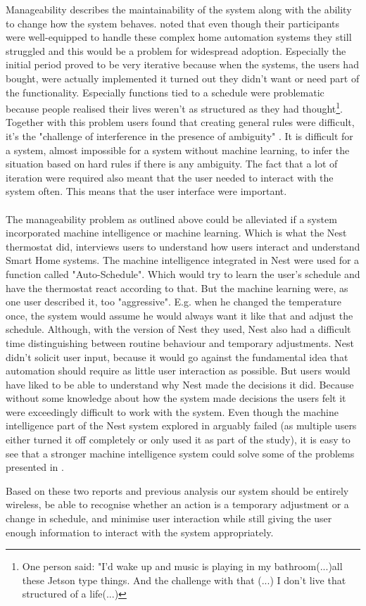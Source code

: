 Manageability describes the maintainability of the system along with the ability to change how the system behaves. \cite{HAInterviews} noted that even though their participants were well-equipped to handle these complex home automation systems they still struggled and this would be a problem for widespread adoption. Especially the initial period proved to be very iterative because when the systems, the users had bought, were actually implemented it turned out they didn't want or need part of the functionality. Especially functions tied to a schedule were problematic because people realised their lives weren't as structured as they had thought\footnote{One person said: "I'd wake up and music is playing in my bathroom(...)all these Jetson type things. And the challenge with that (...) I don't live that structured of a life(...)}. Together with this problem users found that creating general rules were difficult, it's the "challenge of interference in the presence of ambiguity" \cite{HAInterviews}. It is difficult for a system, almost impossible for a system without machine learning, to infer the situation based on hard rules if there is any ambiguity. The fact that a lot of iteration were required also meant that the user needed to interact with the system often. This means that the user interface were important.
\\\\
The manageability problem as outlined above could be alleviated if a system incorporated machine intelligence or machine learning. Which is what the Nest thermostat did, \cite{AdaptiveInterviews} interviews users to understand how users interact and understand Smart Home systems. The machine intelligence integrated in Nest were used for a function called "Auto-Schedule". Which would try to learn the user's schedule and have the thermostat react according to that. But the machine learning were, as one user described it\cite{AdaptiveInterviews}, too "aggressive". E.g. when he changed the temperature once, the system would assume he would always want it like that and adjust the schedule. Although, with the version of Nest they used, Nest also had a difficult time distinguishing between routine behaviour and temporary adjustments. Nest didn't solicit user input, because it would go against the fundamental idea that automation should require as little user interaction as possible. But  users would have liked to be able to understand why Nest made the decisions it did. Because without some knowledge about how the system made decisions the users felt it were exceedingly difficult to work with the system.
Even though the machine intelligence part of the Nest system explored in \cite{AdaptiveInterviews} arguably failed (as multiple users either turned it off completely or only used it as part of the study), it is easy to see that a stronger machine intelligence system could solve some of the problems presented in \cite{HAInterviews}. 

Based on these two reports and previous analysis our system should be entirely wireless, be able to recognise whether an action is a temporary adjustment or a change in schedule, and minimise user interaction while still giving the user enough information to interact with the system appropriately.
\label{int:requirement}
